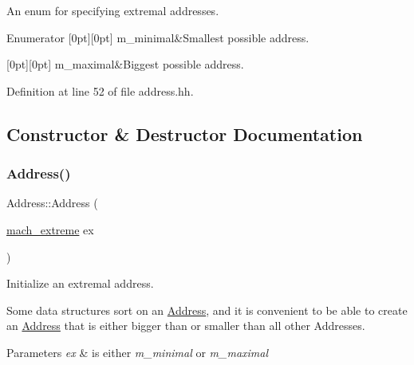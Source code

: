 An enum for specifying extremal addresses. 

\begin{DoxyEnumFields}{Enumerator}
[0pt][0pt]{}\mbox{\label{class_address_ab6dfc48b4779dab420c4ae0bc5aaffd7a1990ccfacf791a707a42d623bdc4134d}} 
m\+\_\+minimal&Smallest possible address. \\
\hline

[0pt][0pt]{}\mbox{\label{class_address_ab6dfc48b4779dab420c4ae0bc5aaffd7abe15025551d5d35578ab1f409e3f6b7f}} 
m\+\_\+maximal&Biggest possible address. \\
\hline

\end{DoxyEnumFields}


Definition at line 52 of file address.\+hh.



\subsection{Constructor \& Destructor Documentation}
\mbox{\label{class_address_a84f096e8cab2cd71a252877055938759}} 
\subsubsection{\texorpdfstring{Address()}{Address()}\hspace{0.1cm}{\footnotesize\ttfamily [1/4]}}
{\footnotesize\ttfamily Address\+::\+Address (\begin{DoxyParamCaption}\item[{\mbox{\hyperlink{class_address_ab6dfc48b4779dab420c4ae0bc5aaffd7}{mach\+\_\+extreme}}}]{ex }\end{DoxyParamCaption})}



Initialize an extremal address. 

Some data structures sort on an \mbox{\hyperlink{class_address}{Address}}, and it is convenient to be able to create an \mbox{\hyperlink{class_address}{Address}} that is either bigger than or smaller than all other Addresses. 
\begin{DoxyParams}{Parameters}
{\em ex} & is either {\itshape m\+\_\+minimal} or {\itshape m\+\_\+maximal} \\
\hline
\end{DoxyParams}


